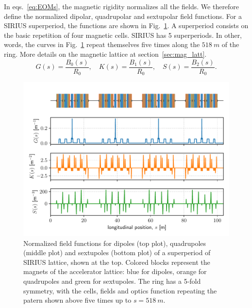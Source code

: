 In eqs.~\eqref{eq:EOMs}, the magnetic rigidity normalizes all the fields. We therefore define the normalized dipolar, quadrupolar and sextupolar field functions. For a SIRIUS superperiod, the functions are shown in Fig.~\ref{fig:field_funcs}. A superperiod consists on the basic repetition of four magnetic cells. SIRIUS has 5 superperiods. In other, words, the curves in Fig.~\ref{fig:field_funcs} repeat themselves five times along the $518~\unit{m}$ of the ring. More details on the magnetic lattice at section~\ref{sec:mag_latt}.
\begin{equation}
    G(s) = \frac{B_0(s)}{R_0}, \quad K(s) = \frac{B_1(s)}{R_0}, \quad S(s) = \frac{B_2(s)}{R_0}.
    \label{eq:mag_funcs}
\end{equation}
\begin{figure}[htb]
    \centering
    \includegraphics[width=\textwidth]{Images/field_functions.pdf}
    \caption[Normalized field functions for dipoles, quadrupoles and sextupoles of a superperiod of SIRIUS lattice]{Normalized field functions for dipoles (top plot), quadrupoles (middle plot) and sextupoles (bottom plot) of a superperiod of SIRIUS lattice, shown at the top. Colored blocks represent the magnets of the accelerator lattice: blue for dipoles, orange for quadrupoles and green for sextupoles. The ring has a 5-fold symmetry, with the cells, fields and optics function repeating the patern shown above five times up to $s=518~\unit{m}$.}
    \label{fig:field_funcs}
\end{figure}
